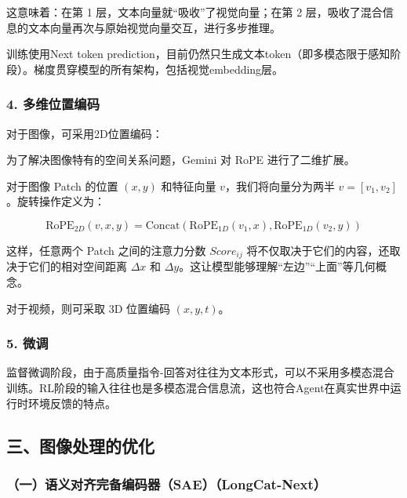 这意味着：在第 1 层，文本向量就``吸收''了视觉向量；在第 2 层，吸收了混合信息的文本向量再次与原始视觉向量交互，进行多步推理。

训练使用Next token prediction，目前仍然只生成文本token（即多模态限于感知阶段）。梯度贯穿模型的所有架构，包括视觉embedding层。

\hypertarget{ux591aux7ef4ux4f4dux7f6eux7f16ux7801}{%
\subsubsection{4. 多维位置编码}\label{ux591aux7ef4ux4f4dux7f6eux7f16ux7801}}

对于图像，可采用2D位置编码：

为了解决图像特有的空间关系问题，Gemini 对 RoPE 进行了二维扩展。

对于图像 Patch 的位置 \((x,y)\) 和特征向量 \(v\)，我们将向量分为两半 \(v=[v_1,v_2]\)。旋转操作定义为：

\[
\mathrm{RoPE}_{2D}(v,x,y)=\mathrm{Concat}(\mathrm{RoPE}_{1D}(v_1,x),\mathrm{RoPE}_{1D}(v_2,y))
\]

这样，任意两个 Patch 之间的注意力分数 \(Score_{ij}\) 将不仅取决于它们的内容，还取决于它们的相对空间距离 \(\Delta x\) 和 \(\Delta y\)。这让模型能够理解``左边''``上面''等几何概念。

对于视频，则可采取 3D 位置编码 \((x,y,t)\)。

\hypertarget{ux5faeux8c03}{%
\subsubsection{5. 微调}\label{ux5faeux8c03}}

监督微调阶段，由于高质量指令-回答对往往为文本形式，可以不采用多模态混合训练。RL阶段的输入往往也是多模态混合信息流，这也符合Agent在真实世界中运行时环境反馈的特点。

\hypertarget{ux4e09ux56feux50cfux5904ux7406ux7684ux4f18ux5316}{%
\subsection{三、图像处理的优化}\label{ux4e09ux56feux50cfux5904ux7406ux7684ux4f18ux5316}}

\hypertarget{ux4e00ux8bedux4e49ux5bf9ux9f50ux5b8cux5907ux7f16ux7801ux5668saelongcat-next}{%
\subsubsection{（一）语义对齐完备编码器（SAE）（LongCat-Next）}\label{ux4e00ux8bedux4e49ux5bf9ux9f50ux5b8cux5907ux7f16ux7801ux5668saelongcat-next}}

